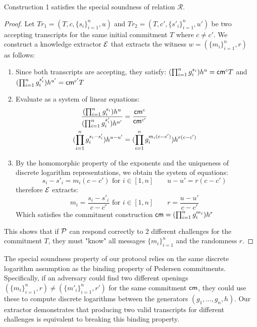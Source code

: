 \begin{theorem}
    Construction 1 satisfies the special soundness of relation $\mathcal{R}$. 
\end{theorem}
\begin{proof}
    Let $Tr_1 = (T, c, \{s_i\}_{i=1}^n, u)$ and $Tr_2 = (T, c', \{s'_i\}_{i=1}^n, u')$ be two accepting transcripts for the same initial commitment $T$ where $c \neq c'$. We construct a knowledge extractor $\mathcal{E}$ that extracts the witness $w = (\{m_i\}_{i=1}^n,r)$ as follows:
    \begin{enumerate}
        \item Since both transcripts are accepting, they satisfy: 
        $(\prod_{i=1}^n g_i^{s_i})h^u = \mathsf{cm}^cT$ and $(\prod_{i=1}^n g_i^{s'_i})h^{u'} = \mathsf{cm}^{c'}T$
        
        \item Evaluate as a system of linear equations:
             \begin{align}
               \frac{(\prod_{i=1}^n g_i^{s_i})h^u}{(\prod_{i=1}^n g_i^{s'_i})h^{u'}} &= \frac{\mathsf{cm}^c}{\mathsf{cm}^{c'}} \notag \\
               (\prod_{i=1}^n g_i^{s_i-s'_i})h^{u-u'} &= (\prod_{i=1}^n g_i^{m_i(c-c')})h^{r(c-c')} \notag
            \end{align}
            
       \item By the homomorphic property of the exponents and the uniqueness of discrete logarithm representations, we obtain the system of equations:
       \[
       s_i-s'_i = m_i(c-c') \text{ for } i \in [1,n] \qquad u-u' = r(c-c')
       \] 
       therefore $\mathcal{E}$ extracts: 
       \[
       m_i = \frac{s_i-s'_i}{c-c'} \text{ for } i \in [1,n] \qquad r = \frac{u-u'}{c-c'}
       \]
       Which satisfies the commitment construction $\mathsf{cm} = (\prod_{i=1}^n g_i^{m_i})h^r$
    \end{enumerate}
    This shows that if $\mathcal{P}$ can respond correctly to 2 different challenges for the commitment $T$, they must "know" all messages $\{m_i\}_{i=1}^n$ and the randomness $r$.
\end{proof}



\begin{remark}
    The special soundness property of our protocol relies on the same discrete logarithm assumption as the binding property of Pedersen commitments. Specifically, if an adversary could find two different openings $(\{m_i\}_{i=1}^n, r) \neq (\{m'_i\}_{i=1}^n, r')$ for the same commitment $\mathsf{cm}$, they could use these to compute discrete logarithms between the generators $(g_1,\ldots,g_n,h)$. Our extractor demonstrates that producing two valid transcripts for different challenges is equivalent to breaking this binding property.
\end{remark}



